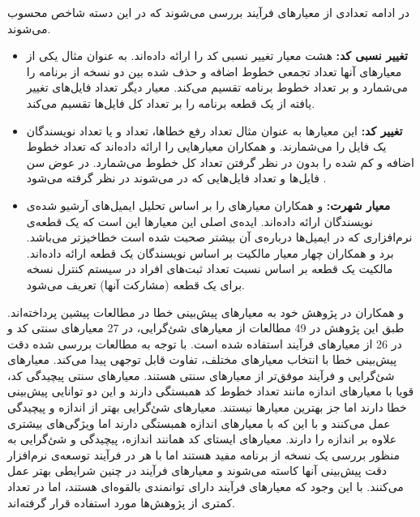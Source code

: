 در ادامه  تعدادی از معیارهای فرآیند بررسی می‌شوند که در این دسته شاخص محسوب می‌شوند. 
\begin{itemize}
\item \textbf{تغییر نسبی کد: }
 هشت معیار تغییر نسبی کد را ارائه داده‌اند\cite{nagappan2005use}. به عنوان مثال یکی از معیار‌های آنها تعداد تجمعی خطوط اضافه و حذف شده بین دو نسخه از برنامه را می‌شمارد و بر تعداد خطوط برنامه تقسیم می‌کند. معیار دیگر تعداد فایل‌های تغییر یافته از یک قطعه برنامه را بر تعداد  کل فایل‌ها تقسیم می‌کند. 
\item \textbf{تغییر کد: }
این معیارها به عنوان مثال تعداد رفع خطاها، تعداد  و یا تعداد نویسندگان یک فایل را می‌شمارند.  و همکاران معیارهایی را ارائه داده‌اند که تعداد خطوط اضافه و کم شده را بدون در نظر گرفتن تعداد کل خطوط می‌شمارد. در عوض سن فایل‌ها و تعداد فایل‌هایی که در   می‌شوند در نظر گرفته می‌شود \cite{moser2008comparative}. 
\item \textbf{معیار شهرت: }
  و همکاران معیارهای  را بر اساس تحلیل ایمیل‌های آرشیو شده‌ی نویسندگان ارائه داده‌اند. ایده‌ی اصلی این معیارها این است که یک قطعه‌ی  نرم‌افزاری که در ایمیل‌ها درباره‌ی آن بیشتر صحبت شده است خطاخیزتر می‌باشد\cite{bacchelli2010popular}. برد و همکاران چهار معیار مالکیت بر اساس نویسندگان یک قطعه ارائه داده‌اند. مالکیت یک قطعه بر اساس نسبت  تعداد ثبت‌های افراد در سیستم کنترل نسخه برای یک قطعه (مشارکت آنها) تعریف می‌شود. \\
\end{itemize}


 و همکاران در پژوهش خود به  معیارهای پیش‌بینی خطا در مطالعات پیشین پرداخته‌اند.  طبق این پژوهش در 49\lr{\%} مطالعات از معیارهای شئ‌گرایی، در 27\lr{\%} معیارهای سنتی کد و در 26 \lr{\%} از معیارهای فرآیند استفاده شده است. با توجه به مطالعات بررسی شده دقت پیش‌بینی خطا  با انتخاب معیارهای مختلف، تفاوت قابل توجهی  پیدا می‌کند. معیارهای شئ‌گرایی و فرآیند موفق‌تر از معیارهای سنتی هستند. معیارهای سنتی  پیچیدگی کد، قویا با معیارهای اندازه مانند تعداد خطوط کد همبستگی دارند و این دو توانایی پیش‌بینی خطا دارند اما جز بهترین معیارها نیستند. معیارهای شئ‌گرایی بهتر از اندازه و پیچیدگی عمل می‌کنند و با این که با معیارهای اندازه همبستگی دارند اما ویژگی‌های بیشتری علاوه بر اندازه را دارند. معیارهای ایستای کد همانند اندازه، پیچیدگی و شئ‌گرایی به منظور بررسی یک نسخه از برنامه مفید هستند اما با هر  در فرآیند توسعه‌ی نرم‌افزار دقت پیش‌بینی آنها کاسته می‌شوند و معیارهای فرآیند در چنین شرایطی بهتر عمل می‌کنند.  با این وجود  که  معیارهای فرآیند‌  دارای توانمندی بالقوه‌ای  هستند، اما در تعداد کمتری از پژوهش‌ها مورد استفاده قرار گرفته‌اند\cite{radjenovic2013software}. \\
 
